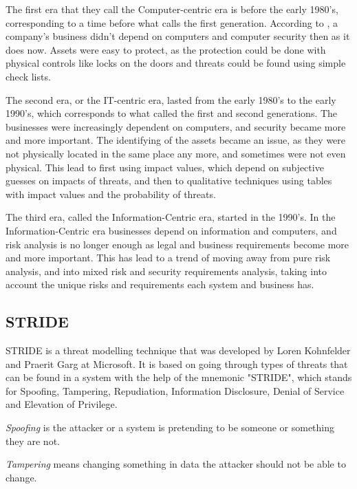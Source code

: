 The first era that they call the Computer-centric era is before the early 1980's, corresponding to a time before what \citet{threat_analysis_1993} calls the first generation.
According to \citet{risk_analysis_to_security_requirements}, a company's business didn't depend on computers and computer security then as it does now.
Assets were easy to protect, as the protection could be done with physical controls like locks on the doors and threats could be found using simple check lists.

The second era, or the IT-centric era, lasted from the early 1980's to the early 1990's, which corresponds to what \citet{threat_analysis_1993} called the first and second generations.
The businesses were increasingly dependent on computers, and security became more and more important.
The identifying of the assets became an issue, as they were not physically located in the same place any more, and sometimes were not even physical.
This lead to first using impact values, which depend on subjective guesses on impacts of threats, and then to qualitative techniques using tables with impact values and the probability of threats. \cite{risk_analysis_to_security_requirements}

The third era, called the Information-Centric era, started in the 1990's.
In the Information-Centric era businesses depend on information and computers, and risk analysis is no longer enough as legal and business requirements become more and more important.
This has lead to a trend of moving away from pure risk analysis, and into mixed risk and security requirements analysis, taking into account the unique risks and requirements each system and business has. \cite{risk_analysis_to_security_requirements}

\subsection{STRIDE}

STRIDE is a threat modelling technique that was developed by Loren Kohnfelder and Praerit Garg at Microsoft. 
It is based on going through types of threats that can be found in a system with the help of the mnemonic "STRIDE", which stands for Spoofing, Tampering, Repudiation, Information Disclosure, Denial of Service and Elevation of Privilege. \cite{threat_modeling_book}

\emph{Spoofing} is the attacker or a system is pretending to be someone or something they are not. 

\emph{Tampering} means changing something in data the attacker should not be able to change.

